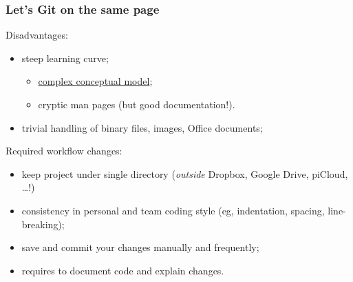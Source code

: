 \documentclass[10pt,svgnames,handout]{beamer}
\begin{document}
\begin{frame}
\frametitle{Let's Git on the same page}
\label{git_cons}

Disadvantages:
\begin{itemize}
  \item steep learning curve;
  \begin{itemize}
      \item \hyperlink{xkcd_git}{complex conceptual model};
      \item cryptic man pages (but good documentation!).
  \end{itemize}  
  \item trivial handling of binary files, images, Office documents;
\end{itemize}

\medskip

Required workflow changes:
\begin{itemize}
  \item keep project under single directory (\emph{outside} Dropbox, Google Drive, piCloud, \ldots!)
  \item consistency in personal and team coding style (eg, indentation, spacing, line-breaking);
  \item save and commit your changes manually and frequently;
  \item requires to document code and explain changes.
\end{itemize}
\end{frame}
\end{document}
